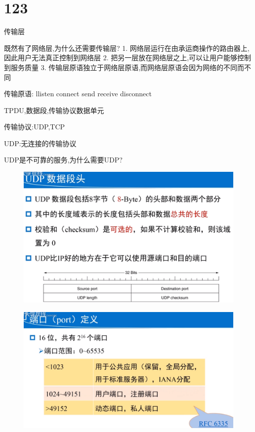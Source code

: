 \documentclass[UTF8,a4paper]{ctexart}
\begin{document}
\section{123}
传输层

既然有了网络层,为什么还需要传输层?
1. 网络层运行在由承运商操作的路由器上,因此用户无法真正控制到网络层
2. 把另一层放在网络层之上,可以让用户能够控制到服务质量
3. 传输层原语独立于网络层原语,而网络层原语会因为网络的不同而不同

传输原语:
llisten
connect
send
receive
disconnect

TPDU,数据段,传输协议数据单元

传输协议:UDP,TCP

UDP:无连接的传输协议

UDP是不可靠的服务,为什么需要UDP?
\begin{figure}[H]
  \centering
  \includegraphics[scale = 0.3]{assets/jisuanjiwangluo_610df.png}
\end{figure}

\begin{figure}[H]
  \centering
  \includegraphics[scale = 0.3]{assets/jisuanjiwangluo_38660.png}
\end{figure}
\end{document}
